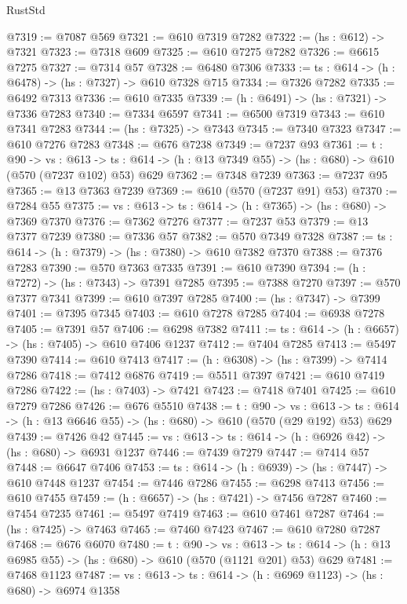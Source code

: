 \begin{lexlean}{RustStd}
\begin{coremodule}
@7319 := @7087 @569
@7321 := @610 @7319 @7282
@7322 := (hs : @612) -> @7321
@7323 := @7318 @609
@7325 := @610 @7275 @7282
@7326 := @6615 @7275
@7327 := @7314 @57
@7328 := @6480 @7306
@7333 := {ts : @614} -> (h : @6478) -> (hs : @7327) -> @610 @7328 @715
@7334 := @7326 @7282
@7335 := @6492 @7313
@7336 := @610 @7335
@7339 := (h : @6491) -> (hs : @7321) -> @7336 @7283
@7340 := @7334 @6597
@7341 := @6500 @7319
@7343 := @610 @7341 @7283
@7344 := (hs : @7325) -> @7343
@7345 := @7340 @7323
@7347 := @610 @7276 @7283
@7348 := @676 @7238
@7349 := @7237 @93
@7361 := {t : @90} ->
  {vs : @613} ->
  {ts : @614} -> (h : @13 @7349 @55) -> (hs : @680) -> @610 (@570 (@7237 @102) @53) @629
@7362 := @7348 @7239
@7363 := @7237 @95
@7365 := @13 @7363 @7239
@7369 := @610 (@570 (@7237 @91) @53)
@7370 := @7284 @55
@7375 := {vs : @613} -> {ts : @614} -> (h : @7365) -> (hs : @680) -> @7369 @7370
@7376 := @7362 @7276
@7377 := @7237 @53
@7379 := @13 @7377 @7239
@7380 := @7336 @57
@7382 := @570 @7349 @7328
@7387 := {ts : @614} -> (h : @7379) -> (hs : @7380) -> @610 @7382 @7370
@7388 := @7376 @7283
@7390 := @570 @7363 @7335
@7391 := @610 @7390
@7394 := (h : @7272) -> (hs : @7343) -> @7391 @7285
@7395 := @7388 @7270
@7397 := @570 @7377 @7341
@7399 := @610 @7397 @7285
@7400 := (hs : @7347) -> @7399
@7401 := @7395 @7345
@7403 := @610 @7278 @7285
@7404 := @6938 @7278
@7405 := @7391 @57
@7406 := @6298 @7382
@7411 := {ts : @614} -> (h : @6657) -> (hs : @7405) -> @610 @7406 @1237
@7412 := @7404 @7285
@7413 := @5497 @7390
@7414 := @610 @7413
@7417 := (h : @6308) -> (hs : @7399) -> @7414 @7286
@7418 := @7412 @6876
@7419 := @5511 @7397
@7421 := @610 @7419 @7286
@7422 := (hs : @7403) -> @7421
@7423 := @7418 @7401
@7425 := @610 @7279 @7286
@7426 := @676 @5510
@7438 := {t : @90} ->
  {vs : @613} ->
  {ts : @614} -> (h : @13 @6646 @55) -> (hs : @680) -> @610 (@570 (@29 @192) @53) @629
@7439 := @7426 @42
@7445 := {vs : @613} -> {ts : @614} -> (h : @6926 @42) -> (hs : @680) -> @6931 @1237
@7446 := @7439 @7279
@7447 := @7414 @57
@7448 := @6647 @7406
@7453 := {ts : @614} -> (h : @6939) -> (hs : @7447) -> @610 @7448 @1237
@7454 := @7446 @7286
@7455 := @6298 @7413
@7456 := @610 @7455
@7459 := (h : @6657) -> (hs : @7421) -> @7456 @7287
@7460 := @7454 @7235
@7461 := @5497 @7419
@7463 := @610 @7461 @7287
@7464 := (hs : @7425) -> @7463
@7465 := @7460 @7423
@7467 := @610 @7280 @7287
@7468 := @676 @6070
@7480 := {t : @90} ->
  {vs : @613} ->
  {ts : @614} -> (h : @13 @6985 @55) -> (hs : @680) -> @610 (@570 (@1121 @201) @53) @629
@7481 := @7468 @1123
@7487 := {vs : @613} -> {ts : @614} -> (h : @6969 @1123) -> (hs : @680) -> @6974 @1358

\end{coremodule}
\end{lexlean}

